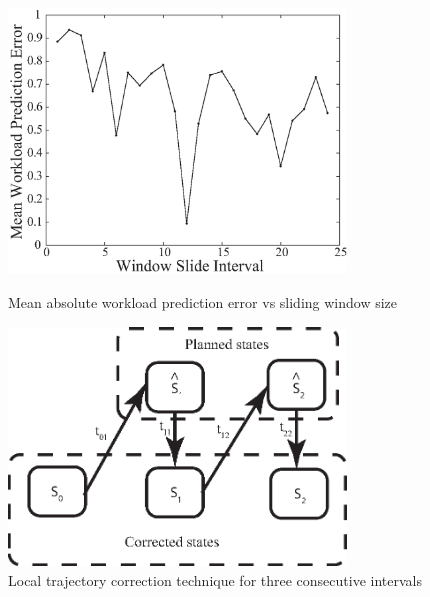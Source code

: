 \begin{figure}[htbp]
  \begin{minipage}{0.45\textwidth}
    \centering
    \includegraphics[width=0.8\textwidth]{pics/workload-pred-error-mean.eps}
    \caption{Mean absolute workload prediction error vs sliding window size}
    \label{fig:workload-pred-error-mean}
  \end{minipage}
  \begin{minipage}{0.45\textwidth}
    \centering         
    \includegraphics[width=0.8\textwidth]{pics/traj-corr2.eps}
    \caption{Local trajectory correction technique for three consecutive intervals}
    \label{fig:traj-corr}
    \end{minipage}
\end{figure}

